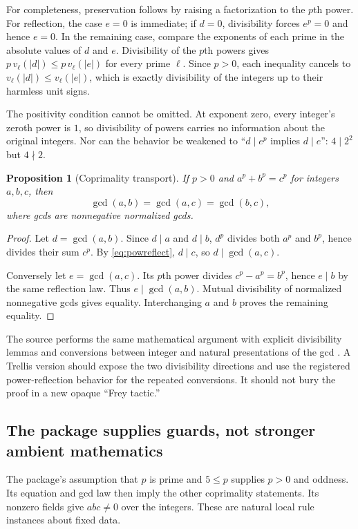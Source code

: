 \documentclass[11pt,a4paper]{article}
\newtheorem{proposition}[theorem]{Proposition}
\theoremstyle{definition}
\theoremstyle{remark}
\begin{document}
For completeness, preservation follows by raising a factorization to the $p$th power. For reflection, the case $e=0$ is immediate; if $d=0$, divisibility forces $e^p=0$ and hence $e=0$. In the remaining case, compare the exponents of each prime in the absolute values of $d$ and $e$. Divisibility of the $p$th powers gives $p\,v_\ell(|d|)\le p\,v_\ell(|e|)$ for every prime $\ell$. Since $p>0$, each inequality cancels to $v_\ell(|d|)\le v_\ell(|e|)$, which is exactly divisibility of the integers up to their harmless unit signs.

The positivity condition cannot be omitted. At exponent zero, every integer's zeroth power is $1$, so divisibility of powers carries no information about the original integers. Nor can the behavior be weakened to ``$d\mid e^p$ implies $d\mid e$'': $4\mid2^2$ but $4\nmid2$.

\begin{proposition}[Coprimality transport]
If $p>0$ and $a^p+b^p=c^p$ for integers $a,b,c$, then
\[
 \gcd(a,b)=\gcd(a,c)=\gcd(b,c),
\]
where gcds are nonnegative normalized gcds.
\end{proposition}
\begin{proof}
Let $d=\gcd(a,b)$. Since $d\mid a$ and $d\mid b$, $d^p$ divides both $a^p$ and $b^p$, hence divides their sum $c^p$. By \eqref{eq:powreflect}, $d\mid c$, so $d\mid\gcd(a,c)$.

Conversely let $e=\gcd(a,c)$. Its $p$th power divides $c^p-a^p=b^p$, hence $e\mid b$ by the same reflection law. Thus $e\mid\gcd(a,b)$. Mutual divisibility of normalized nonnegative gcds gives equality. Interchanging $a$ and $b$ proves the remaining equality.
\end{proof}

The source performs the same mathematical argument with explicit divisibility lemmas and conversions between integer and natural presentations of the gcd \cite{freyDef}. A Trellis version should expose the two divisibility directions and use the registered power-reflection behavior for the repeated conversions. It should not bury the proof in a new opaque ``Frey tactic.''

\subsection{The package supplies guards, not stronger ambient mathematics}
The package's assumption that $p$ is prime and $5\le p$ supplies $p>0$ and oddness. Its equation and gcd law then imply the other coprimality statements. Its nonzero fields give $abc\ne0$ over the integers. These are natural local rule instances about fixed data.
\end{document}
